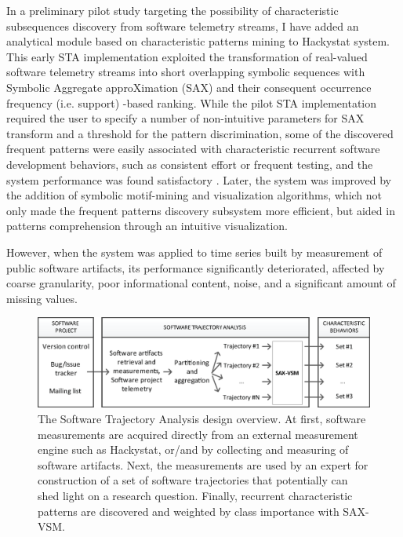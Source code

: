 In a preliminary pilot study targeting the possibility of characteristic subsequences discovery from 
software telemetry streams, I have added an analytical module based on characteristic patterns mining 
to Hackystat system. This early STA implementation exploited the transformation of real-valued software 
telemetry streams into short overlapping symbolic sequences with Symbolic Aggregate approXimation 
(SAX) \cite{sax} and their consequent occurrence frequency (i.e. support) -based ranking. 
While the pilot STA implementation required the user to specify a number of non-intuitive parameters for 
SAX transform and a threshold for the pattern discrimination, some of the discovered frequent patterns 
were easily associated with characteristic recurrent software development behaviors, such as consistent 
effort or frequent testing, and the system performance was found satisfactory \cite{csdl2-10-09}.
Later, the system was improved by the addition of symbolic motif-mining and visualization algorithms, 
which not only made the frequent patterns discovery subsystem more efficient, 
but aided in patterns comprehension through an intuitive visualization. 

However, when the system was applied to time series built by measurement of public software artifacts, 
its performance significantly deteriorated, affected by coarse granularity, poor informational content,
noise, and a significant amount of missing values. 

\begin{figure}[t]
   \centering
   \includegraphics[width=150mm]{figures/STA_overview.eps}
   \caption[The Software Trajectory Analysis design overview.]{The Software Trajectory Analysis design overview. 
    At first, software measurements are acquired directly from an external measurement engine such as Hackystat, 
    or/and by collecting and measuring of software artifacts.
    Next, the measurements are used by an expert for construction of a set of software trajectories that 
    potentially can shed light on a research question. 
    Finally, recurrent characteristic patterns are discovered and weighted by class importance with SAX-VSM.}
   \label{fig:sta-overview}
\end{figure}


